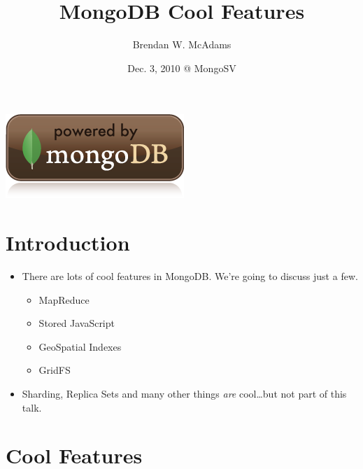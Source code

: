 \documentclass[xcolor=dvipsnames]{beamer}
\title{MongoDB Cool Features} %
\institute[10gen, Inc.]{10gen, Inc.}
\author[B.W. McAdams]{Brendan W. McAdams}
\date{Dec. 3, 2010 @ MongoSV}
\newenvironment{itemizeframe}
               {\begin{frame}\startitemizeframe} 
               {\stopitemizeframe\end{frame}}
\newcommand\startitemizeframe{\begin{itemize}} \newcommand\stopitemizeframe{\end{itemize}}
\begin{document}
\begin{frame}
  \titlepage
  \begin{center}
  \includegraphics[scale=0.25]{images/powered_mongo.png}
  \end{center}
\end{frame}

\section{Introduction}

\begin{itemizeframe}
        \frametitle{Cool Features?}
        \item There are lots of cool features in MongoDB.  We're going to discuss just a few.
            \begin{itemize}
                \item MapReduce
                \item Stored JavaScript 
                \item GeoSpatial Indexes
                \item GridFS
            \end{itemize}
        \item Sharding, Replica Sets and many other things {\em are} cool\ldots but not part of this talk.
\end{itemizeframe}

\section{Cool Features}
\end{document}
